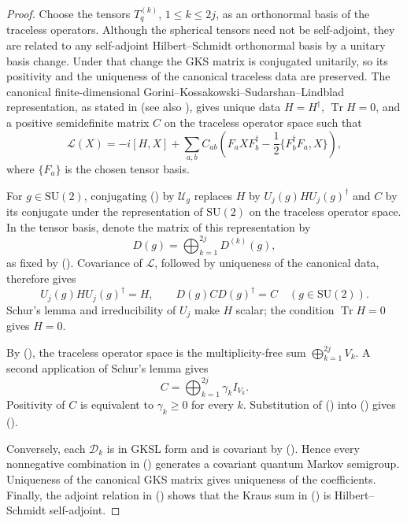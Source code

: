 \documentclass[twoside,10pt]{article}
\numberwithin{equation}{section}
\theoremstyle{slbody}
\theoremstyle{definition}
\theoremstyle{remark}
\newcommand{\SU}{\mathrm{SU}(2)}
\newcommand{\Tr}{\operatorname{Tr}}
\newcommand{\cL}{\mathcal L}
\newcommand{\cD}{\mathcal D}
\newcommand{\cU}{\mathcal U}
\renewcommand{\eqref}[1]{%
  \textup{{\normalfont(\oldstylenums{\ref{#1}}}\normalfont)}}
\begin{document}
\begin{proof}
Choose the tensors \(T_q^{(k)}\), \(1\leq k\leq2j\), as an orthonormal
basis of the traceless operators.  Although the spherical tensors need
not be self-adjoint, they are related to any self-adjoint
Hilbert--Schmidt orthonormal basis by a unitary basis change.  Under that
change the GKS matrix is conjugated unitarily, so its positivity and the
uniqueness of the canonical traceless data are preserved.  The canonical
finite-dimensional Gorini--Kossakowski--Sudarshan--Lindblad representation,
as stated in
\cite[Theorem~2.2 and Lemma~2.3]{GoriniKossakowskiSudarshan1976}
(see also \cite[Theorem~2]{Lindblad1976}), gives unique data
\(H=H^\dagger\), \(\Tr H=0\), and a positive semidefinite matrix \(C\)
on the traceless operator space such that
\begin{equation}\label{eq:canonical-gks}
 \cL(X)=-i[H,X]+\sum_{a,b}C_{ab}
 \left(F_aXF_b^\dagger-\frac12\{F_b^\dagger F_a,X\}\right),
\end{equation}
where \(\{F_a\}\) is the chosen tensor basis.

For \(g\in\SU\), conjugating \eqref{eq:canonical-gks} by \(\cU_g\)
replaces \(H\) by \(U_j(g)HU_j(g)^\dagger\) and \(C\) by its conjugate
under the representation of \(\SU\) on the traceless operator space.
In the tensor basis, denote the matrix of this representation by
\begin{equation*}
 D(g)=\bigoplus_{k=1}^{2j}D^{(k)}(g),
\end{equation*}
as fixed by \eqref{eq:tensor-transform}.
Covariance of \(\cL\), followed by uniqueness of the canonical data,
therefore gives
\begin{equation}\label{eq:canonical-invariance}
 U_j(g)HU_j(g)^\dagger=H,
 \qquad D(g)CD(g)^\dagger=C
 \quad(g\in\SU).
\end{equation}
Schur's lemma and irreducibility of \(U_j\) make \(H\) scalar; the
condition \(\Tr H=0\) gives \(H=0\).

By \eqref{eq:adjoint-decomposition}, the traceless operator space is
the multiplicity-free sum \(\bigoplus_{k=1}^{2j}V_k\).  A second
application of Schur's lemma gives
\begin{equation}\label{eq:gks-blocks}
 C=\bigoplus_{k=1}^{2j}\gamma_k I_{V_k}.
\end{equation}
Positivity of \(C\) is equivalent to \(\gamma_k\geq0\) for every \(k\).
Substitution of \eqref{eq:gks-blocks} into
\eqref{eq:canonical-gks} gives \eqref{eq:generator-cone}.

Conversely, each \(\cD_k\) is in GKSL form and is covariant by
\eqref{eq:tensor-transform}.  Hence every nonnegative combination in
\eqref{eq:generator-cone} generates a covariant quantum Markov
semigroup.  Uniqueness of the canonical GKS matrix gives uniqueness of
the coefficients.  Finally, the adjoint relation in
\eqref{eq:tensor-transform} shows that the Kraus sum in
\eqref{eq:dissipator-simplified} is Hilbert--Schmidt self-adjoint.
\end{proof}
\end{document}
